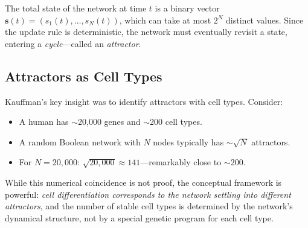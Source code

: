 The total state of the network at time $t$ is a binary vector $\mathbf{s}(t) = (s_1(t), \ldots, s_N(t))$, which can take at most $2^N$ distinct values. Since the update rule is deterministic, the network must eventually revisit a state, entering a \emph{cycle}---called an \emph{attractor}.

\subsection{Attractors as Cell Types}

Kauffman's key insight was to identify attractors with cell types. Consider:

\begin{itemize}[leftmargin=1.8em]
  \item A human has $\sim$20,000 genes and $\sim$200 cell types.
  \item A random Boolean network with $N$ nodes typically has $\sim\!\sqrt{N}$ attractors.
  \item For $N = 20{,}000$: $\sqrt{20{,}000} \approx 141$---remarkably close to $\sim$200.
\end{itemize}

While this numerical coincidence is not proof, the conceptual framework is powerful: \emph{cell differentiation corresponds to the network settling into different attractors}, and the number of stable cell types is determined by the network's dynamical structure, not by a special genetic program for each cell type.

